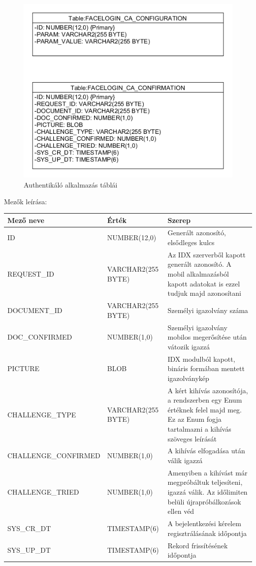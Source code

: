 \begin{figure}[h]
 \begin{minipage}{1\textwidth} 
\centering
    \includegraphics[scale=0.8]{img/facelogin_ca_db}
    \caption{Authentikáló alkalmazás táblái}
 \end{minipage}
\end{figure}
\newpage
Mezők leírása:

\begin{tabular}{|p{5.5cm}|p{3cm} |p{6cm}|}
   	\hline
	\textbf{Mező neve} & \textbf{Érték} & \textbf{Szerep}\\ \hline
	ID & NUMBER(12,0) & Generált azonosító, elsődleges kulcs \\ \hline
	REQUEST\_ID & VARCHAR2(255 BYTE) & Az IDX szerverből kapott generált azonosító. A mobil alkalmazásból kapott adatokat is ezzel tudjuk majd azonosítani \\ \hline
	DOCUMENT\_ID & VARCHAR2(255 BYTE)& Személyi igazolvány száma \\ \hline
	DOC\_CONFIRMED & NUMBER(1,0) & Személyi igazolvány mobilos megerősítése után vátozik igazzá\\ \hline
	PICTURE & BLOB & IDX modulból kapott, bináris formában mentett igazolványkép\\ \hline
	CHALLENGE\_TYPE & VARCHAR2(255 BYTE)& A kért kihívás azonosítója, a rendszerben egy Enum értéknek felel majd meg. Ez az Enum fogja tartalmazni a kihívás szöveges leírását \\ \hline
	CHALLENGE\_CONFIRMED & NUMBER(1,0)& A kihívás elfogadása után válik igazzá \\ \hline
	CHALLENGE\_TRIED & NUMBER(1,0) & Amenyiben a kihívást már megpróbáltuk teljesíteni, igazzá válik. Az időlimiten belüli újrapróbálkozások ellen véd \\ \hline
	SYS\_CR\_DT & TIMESTAMP(6)& A bejelentkezési kérelem regisztrálásának időpontja \\ \hline
	SYS\_UP\_DT & TIMESTAMP(6)& Rekord frissítésének időpontja \\ \hline
\end{tabular}

